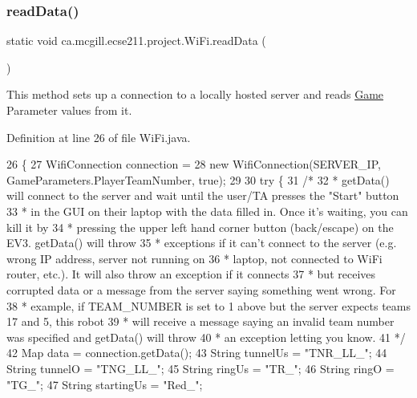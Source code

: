 \subsubsection{\texorpdfstring{read\+Data()}{readData()}}
{\footnotesize\ttfamily static void ca.\+mcgill.\+ecse211.\+project.\+Wi\+Fi.\+read\+Data (\begin{DoxyParamCaption}{ }\end{DoxyParamCaption})\hspace{0.3cm}{\ttfamily [static]}}

This method sets up a connection to a locally hosted server and reads \hyperlink{enumca_1_1mcgill_1_1ecse211_1_1project_1_1_game}{Game} Parameter values from it. 

Definition at line 26 of file Wi\+Fi.\+java.


\begin{DoxyCode}
26                                 \{
27     WifiConnection connection =
28         \textcolor{keyword}{new} WifiConnection(SERVER\_IP, GameParameters.PlayerTeamNumber, \textcolor{keyword}{true});
29 
30     \textcolor{keywordflow}{try} \{
31       \textcolor{comment}{/*}
32 \textcolor{comment}{       * getData() will connect to the server and wait until the user/TA presses the "Start" button}
33 \textcolor{comment}{       * in the GUI on their laptop with the data filled in. Once it's waiting, you can kill it by}
34 \textcolor{comment}{       * pressing the upper left hand corner button (back/escape) on the EV3. getData() will throw}
35 \textcolor{comment}{       * exceptions if it can't connect to the server (e.g. wrong IP address, server not running on}
36 \textcolor{comment}{       * laptop, not connected to WiFi router, etc.). It will also throw an exception if it connects}
37 \textcolor{comment}{       * but receives corrupted data or a message from the server saying something went wrong. For}
38 \textcolor{comment}{       * example, if TEAM\_NUMBER is set to 1 above but the server expects teams 17 and 5, this robot}
39 \textcolor{comment}{       * will receive a message saying an invalid team number was specified and getData() will throw}
40 \textcolor{comment}{       * an exception letting you know.}
41 \textcolor{comment}{       */}
42       Map data = connection.getData();
43       String tunnelUs = \textcolor{stringliteral}{"TNR\_LL\_"};
44       String tunnelO = \textcolor{stringliteral}{"TNG\_LL\_"};
45       String ringUs = \textcolor{stringliteral}{"TR\_"};
46       String ringO = \textcolor{stringliteral}{"TG\_"};
47       String startingUs = \textcolor{stringliteral}{"Red\_"};

\end{DoxyCode}
